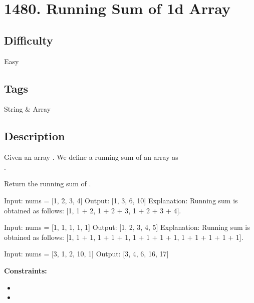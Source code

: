 \tocless\section{1480. Running Sum of 1d Array}
\label{algo:1480}

\subsection*{Difficulty}
Easy

\subsection*{Tags}
String \& Array

\subsection*{Description}
Given an array . We define a running sum of an array as \\ .

Return the running sum of .

\begin{example}
\begin{multilinecode}
Input: nums = [1, 2, 3, 4]
Output: [1, 3, 6, 10]
Explanation: Running sum is obtained as follows: [1, 1 + 2, 1 + 2 + 3, 1 + 2 + 3 + 4].
\end{multilinecode}
\end{example}

\begin{example}
\begin{multilinecode}
Input: nums = [1, 1, 1, 1, 1]
Output: [1, 2, 3, 4, 5]
Explanation: Running sum is obtained as follows: [1, 1 + 1, 1 + 1 + 1, 1 + 1 + 1 + 1, 1 + 1 + 1 + 1 + 1].
\end{multilinecode}
\end{example}

\begin{example}
\begin{multilinecode}
Input: nums = [3, 1, 2, 10, 1]
Output: [3, 4, 6, 16, 17]
\end{multilinecode}
\end{example}

\textbf{Constraints:}
\begin{itemize}
    \item {}
    \item {}
\end{itemize}

